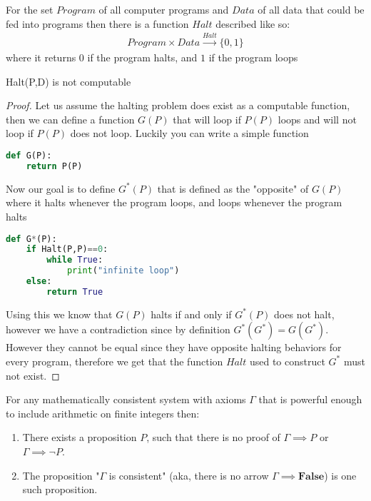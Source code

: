 For the set $Program$ of all computer programs and $Data$ of all data that could be fed into programs then there is a function $Halt$ described like so:
\begin{align}
    Program \times Data \xrightarrow{Halt} \{0,1\}
\end{align}
where it returns $0$ if the program halts, and $1$ if the program loops
\begin{theorem}
    Halt(P,D) is not computable
\end{theorem}
\begin{proof}
    Let us assume the halting problem does exist as a computable function, then we can define a function $G(P)$ that will loop if $P(P)$ loops and will not loop if $P(P)$ does not loop. Luckily you can write a simple function
\begin{lstlisting}[language=Python]
def G(P):
    return P(P)
\end{lstlisting}
Now our goal is to define $G^*(P)$ that is defined as the "opposite" of $G(P)$ where it halts whenever the program loops, and loops whenever the program halts
\begin{lstlisting}[language=Python]
def G*(P):
    if Halt(P,P)==0:
        while True:
            print("infinite loop")
    else:
        return True
\end{lstlisting}
Using this we know that $G(P)$ halts if and only if $G^*(P)$ does not halt, however we have a contradiction since by definition $G^*(G^*)=G(G^*)$. However they cannot be equal since they have opposite halting behaviors for every program, therefore we get that the function $Halt$ used to construct $G^*$ must not exist.
\end{proof}
\begin{theorem}
    For any mathematically consistent system with axioms $\Gamma$ that is powerful enough to include arithmetic on finite integers then:
    \begin{enumerate}
        \item There exists a proposition $P$, such that there is no proof of $\Gamma \implies P$ or $\Gamma \implies \neg P$.
        \item The proposition "$\Gamma$ is consistent" (aka, there is no arrow $\Gamma \implies \textbf{False}$) is one such proposition.
    \end{enumerate}
\end{theorem}

